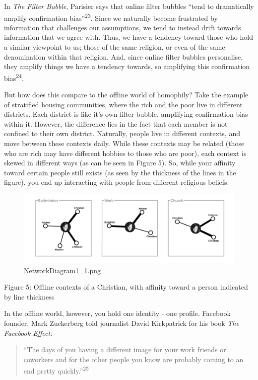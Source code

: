 \documentclass[]{article}
\begin{document}
In \emph{The Filter Bubble}, Parisier says that online filter bubbles
``tend to dramatically amplify confirmation bias''\textsuperscript{23}.
Since we naturally become frustrated by information that challenges our
assumptions, we tend to instead drift towards information that we agree
with. Thus, we have a tendency toward those who hold a similar viewpoint
to us; those of the same religion, or even of the same denomination
within that religion. And, since online filter bubbles personalise, they
amplify things we have a tendency towards, so amplifying this
confirmation bias\textsuperscript{24}.

But how does this compare to the offline world of homophily? Take the
example of stratified housing communities, where the rich and the poor
live in different districts. Each district is like it's own filter
bubble, amplifying confirmation bias within it. However, the difference
lies in the fact that each member is not confined to their own district.
Naturally, people live in different contexts, and move between these
contexts daily. While these contexts may be related (those who are rich
may have different hobbies to those who are poor), each context is
skewed in different ways (as can be seen in Figure 5). So, while your
affinity toward certain people still exists (as seen by the thickness of
the lines in the figure), you end up interacting with people from
different religious beliefs.

\begin{figure}
\centering
\includegraphics{./NetworkDiagram1_1.png}
\caption{NetworkDiagram1\_1.png}
\end{figure}

Figure 5: Offline contexts of a Christian, with affinity toward a person
indicated by line thickness

In the offline world, however, you hold one identity - one profile.
Facebook founder, Mark Zuckerberg told journalist David Kirkpatrick for
his book \emph{The Facebook Effect:}

\begin{quote}
``The days of you having a different image for your work friends or
coworkers and for the other people you know are probably coming to an
end pretty quickly.''\textsuperscript{25}
\end{quote}
\end{document}
